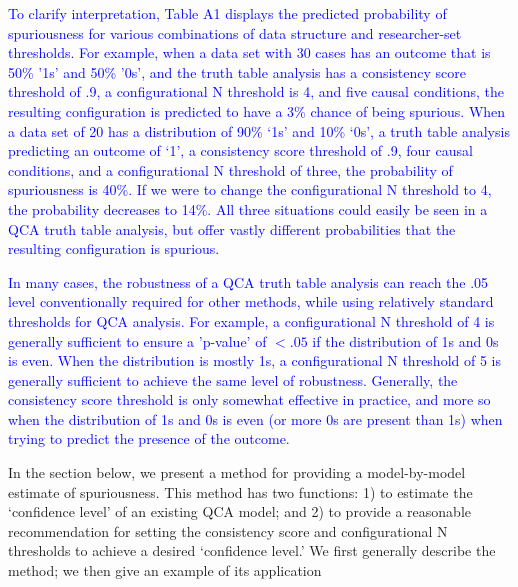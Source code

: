 \documentclass[12pt]{article}
\begin{document}
{{{{\textcolor{blue}{To clarify interpretation, Table A1 displays the predicted probability of spuriousness for various combinations of data structure and researcher-set thresholds. For example, when a data set with 30 cases has an outcome that is 50\% '1s' and 50\% '0s', and the truth table analysis has a consistency score threshold of .9, a configurational N threshold is 4, and five causal conditions, the resulting configuration is predicted to have a 3\% chance of being spurious. When a data set of 20 has a distribution of 90\% `1s' and 10\% `0s', a truth table analysis predicting an outcome of `1', a consistency score threshold of .9, four causal conditions, and a configurational N threshold of three, the probability of spuriousness is 40\%. If we were to change the configurational N threshold to 4, the probability decreases to 14\%. All three situations could easily be seen in a QCA truth table analysis, but offer vastly different probabilities that the resulting configuration is spurious.}

\textcolor{blue}{In many cases, the robustness of a QCA truth table analysis can reach the .05 level conventionally required for other methods, while using relatively standard thresholds for QCA analysis. For example, a configurational N threshold of 4 is generally sufficient to ensure a 'p-value' of $<.05$ if the distribution of 1s and 0s is even. When the distribution is mostly 1s, a configurational N threshold of 5 is generally sufficient to achieve the same level of robustness. Generally, the consistency score threshold is only somewhat effective in practice, and more so when the distribution of 1s and 0s is even (or more 0s are present than 1s) when trying to predict the presence of the outcome.}


In the section below, we present a method for providing a model-by-model estimate of spuriousness. This method has two functions: 1) to estimate the `confidence level' of an existing QCA model; and 2) to provide a reasonable recommendation for setting the consistency score and configurational N thresholds to achieve a desired `confidence level.' We first generally describe the method; we then give an example of its application 


}}}}
\end{document}

